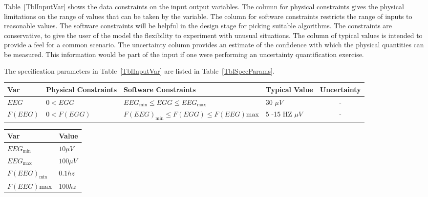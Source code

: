 \documentclass[12pt]{article}
\begin{document}
Table~\ref{TblInputVar} shows the data constraints on the input output
variables.  The column for physical constraints gives the physical limitations
on the range of values that can be taken by the variable.  The column for
software constraints restricts the range of inputs to reasonable values.  The
software constraints will be helpful in the design stage for picking suitable
algorithms.  The constraints are conservative, to give the user of the model the
flexibility to experiment with unusual situations.  The column of typical values
is intended to provide a feel for a common scenario.  The uncertainty column
provides an estimate of the confidence with which the physical quantities can be
measured.  This information would be part of the input if one were performing an
uncertainty quantification exercise.

The specification parameters in Table~\ref{TblInputVar} are listed in
Table~\ref{TblSpecParams}.

\begin{table}[!h]
  \caption{Input Variables} \label{TblInputVar}
  \renewcommand{\arraystretch}{1.2}
\noindent \begin{longtable*}{l l l l c} 
  \toprule
  \textbf{Var} & \textbf{Physical Constraints} & \textbf{Software Constraints} &
                             \textbf{Typical Value} & \textbf{Uncertainty}\\
  \midrule 
  $EEG$ & $0<EGG$ & $EEG_\text{min} \leq EGG \leq EEG_\text{max}$ & 30 $\mu V$ & -  \\
  $F(EEG)$ & $0<F(EGG)$ & $F(EEG)_\text{min} \leq F(EGG) \leq F(EEG)\text{max}$ & 5 -15 HZ $\mu V$ & -  \\
  \bottomrule
\end{longtable*}
\end{table}


\begin{table}[!h]
\caption{Specification Parameter Values} \label{TblSpecParams}
\renewcommand{\arraystretch}{1.2}
\noindent \begin{longtable*}{l l} 
  \toprule
  \textbf{Var} & \textbf{Value} \\
  \midrule 
  $EEG_\text{min}$ & $10 \mu V$\\
   $EEG_\text{max}$ & $100 \mu V$\\
   $F(EEG)_\text{min}$ & $0.1 hz $\\
   $F(EEG)\text{max}$ & $100 hz $\\
  \bottomrule
\end{longtable*}
\end{table}
\end{document}

